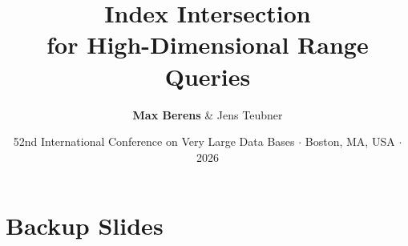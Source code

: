 \documentclass[aspectratio=169]{beamer}
\title{Index Intersection\\for High-Dimensional Range Queries}
\author{\textbf{Max Berens} \& Jens Teubner}
\date{52nd International Conference on Very Large Data Bases $\cdot$ Boston, MA, USA $\cdot$ 2026}
\begin{document}
\maketitle











\appendix
\section{Backup Slides}

% 
\end{document}

